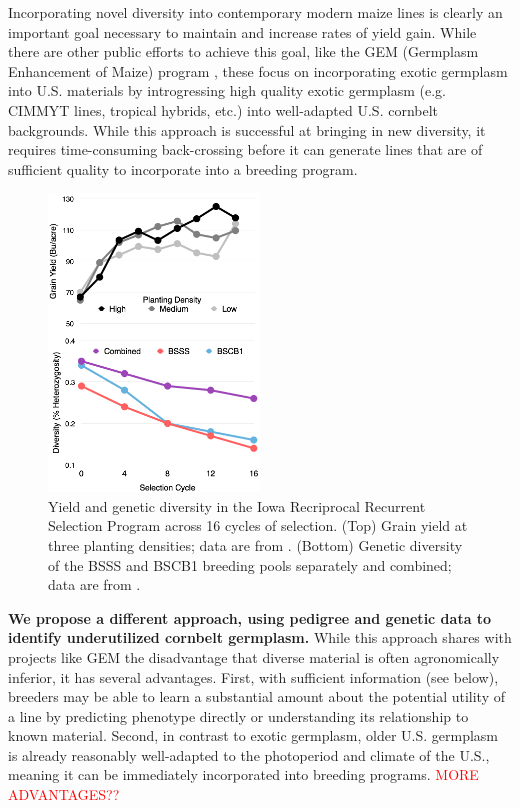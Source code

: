 \documentclass[draft,12pt]{article}
\begin{document}
Incorporating novel diversity into contemporary modern maize lines is clearly an important goal necessary to maintain and increase rates of yield gain.
While there are other public efforts to achieve this goal, like the GEM  (Germplasm Enhancement of Maize) program \citep{pollak2003history}, these  focus on incorporating exotic germplasm into U.S. materials by introgressing high quality exotic germplasm (e.g. CIMMYT lines, tropical hybrids, etc.) into well-adapted U.S. cornbelt backgrounds.
While this approach is successful at bringing in new diversity, it requires time-consuming back-crossing before it can generate lines that are of sufficient quality to incorporate into a breeding program.

\begin{figure}
\includegraphics[width=0.5\textwidth]{BSSS.png}
\caption{Yield and genetic diversity in the Iowa Recriprocal Recurrent Selection Program across 16 cycles of selection. (Top) Grain yield at three planting densities; data are from \citet{rouse2003selection}. (Bottom) Genetic diversity of the BSSS and BSCB1 breeding pools separately and combined; data are from \citet{Gerke:2013tw}.} 
\label{fig:trends}
\end{figure}

\textbf{We propose a different approach, using pedigree and genetic data to identify underutilized cornbelt germplasm.}  
While this approach shares with projects like GEM the disadvantage that diverse material is often  agronomically inferior, it has several advantages.  
First, with sufficient information (see below), breeders may be able to learn a substantial amount about the potential utility of a line by predicting phenotype directly or understanding its relationship to known material. 
Second, in contrast to exotic germplasm, older U.S. germplasm is already reasonably well-adapted to the photoperiod and climate of the U.S., meaning it can be immediately incorporated into breeding programs.
\textcolor{red}{MORE ADVANTAGES??}
\end{document}
